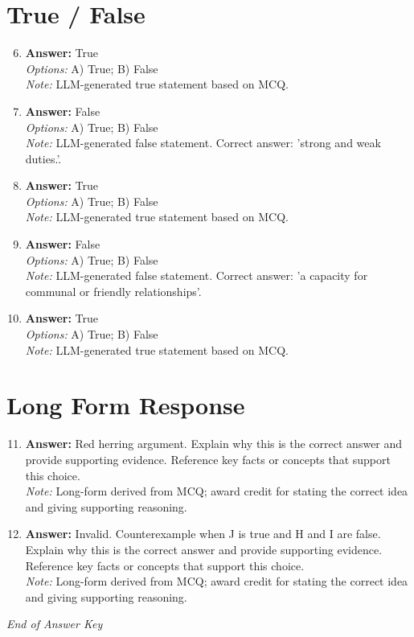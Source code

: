 \documentclass[12pt]{article}
\begin{document}
\section*{True / False}
\begin{enumerate}[label=\arabic*.]
\setcounter{enumi}{5}
\item \textbf{Answer:} True
\\ \textit{Options:} A) True; B) False
\\ \textit{Note:} LLM-generated true statement based on MCQ.
\item \textbf{Answer:} False
\\ \textit{Options:} A) True; B) False
\\ \textit{Note:} LLM-generated false statement. Correct answer: 'strong and weak duties.'.
\item \textbf{Answer:} True
\\ \textit{Options:} A) True; B) False
\\ \textit{Note:} LLM-generated true statement based on MCQ.
\item \textbf{Answer:} False
\\ \textit{Options:} A) True; B) False
\\ \textit{Note:} LLM-generated false statement. Correct answer: 'a capacity for communal or friendly relationships'.
\item \textbf{Answer:} True
\\ \textit{Options:} A) True; B) False
\\ \textit{Note:} LLM-generated true statement based on MCQ.
\end{enumerate}

\section*{Long Form Response}
\begin{enumerate}[label=\arabic*.]
\setcounter{enumi}{10}
\item \textbf{Answer:} Red herring argument. Explain why this is the correct answer and provide supporting evidence. Reference key facts or concepts that support this choice.
\\ \textit{Note:} Long-form derived from MCQ; award credit for stating the correct idea and giving supporting reasoning.
\item \textbf{Answer:} Invalid. Counterexample when J is true and H and I are false. Explain why this is the correct answer and provide supporting evidence. Reference key facts or concepts that support this choice.
\\ \textit{Note:} Long-form derived from MCQ; award credit for stating the correct idea and giving supporting reasoning.
\end{enumerate}

\vfill
\noindent\textit{End of Answer Key}
\end{document}
